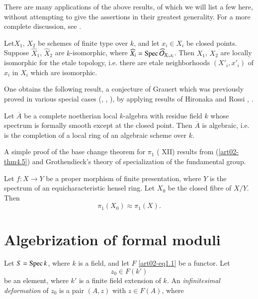 There are many applications of the above results, of which we will list a few here, without attempting to give the assertions in their greatest generality. For a more complete discussion, see \cite{art02-key4}.

\begin{theorem}\label{art02-thm4.6}
Let\pageoriginale $X_{1}$, $X_{2}$ be schemes of finite type over $k$, and let $x_{i}\in X_{i}$ be closed points. Suppose $\widehat{X}_{1}$, $\widehat{X}_{2}$ are $k$-isomorphic, where $\widehat{X}_{i}=\operatorname{\mathrm{Spec}} \widehat{\mathcal{O}}_{X_{i},x_{i}}$. Then $X_{1}$, $X_{2}$ are locally isomorphic for the etale topology, i.e. there are etale neighborhoods $(X'_{i},x'_{i})$ of $x_{i}$ in $X_{i}$ which are isomorphic.
\end{theorem}

One obtains the following result, a conjecture of Grauert which was previously proved in various special cases (\cite{art02-key31}, \cite{art02-key17}, \cite{art02-key2}), by applying results of Hironaka and Rossi \cite{art02-key18}, \cite{art02-key15}.

\begin{theorem}\label{art02-thm4.7}
Let $\overline{A}$ be a complete noetherian local $k$-algebra with residue field $k$ whose spectrum is formally smooth except at the closed point. Then $\overline{A}$ is algebraic, i.e. is the completion of a local ring of an algebraic scheme over $k$.
\end{theorem}

A simple proof of the base change theorem for $\pi_{1}$ (\cite{art02-key6} XII) results from (\ref{art02-thm4.5}) and Grothendieck's theory of specialization of the fundamental group.

\begin{theorem}\label{art02-thm4.8}
Let $f:X\to Y$ be a proper morphism of finite presentation, where $Y$ is the spectrum of an equicharacteristic hensel ring. Let $X_{0}$ be the closed fibre of $X/Y$. Then
$$
\pi_{1}(X_{0})\approx \pi_{1}(X).
$$
\end{theorem}

\section{Algebrization of formal moduli}\label{art02-sec5}

Let $S=\operatorname{\mathrm{Spec}} k$, where $k$ is a field, and let $F$ \eqref{art02-eq1.1} be a functor. Let
$$
z_{0}\in F(k')
$$
be an element, where $k'$ is a finite field extension of $k$. An {\em infinitesimal deformation} of $z_{0}$ is a pair $(A,z)$ with $z\in F(A)$, where

